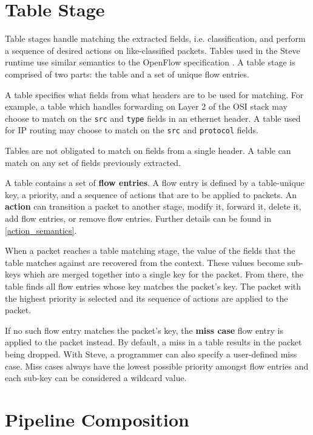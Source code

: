 \section{Table Stage}

Table stages handle matching the extracted fields, i.e. classification, and perform a sequence of desired actions on like-classified packets. Tables used in the Steve runtime use similar semantics to the OpenFlow specification \cite{openflow_spec}. A table stage is comprised of two parts: the table and a set of unique flow entries.

A table specifies what fields from what headers are to be used for matching. For example, a table which handles forwarding on Layer 2 of the OSI stack may choose to match on the \texttt{src} and \texttt{type} fields in an ethernet header. A table used for IP routing may choose to match on the \texttt{src} and \texttt{protocol} fields. 

Tables are not obligated to match on fields from a single header. A table can match on any set of fields previously extracted.

A table contains a set of \textbf{flow entries}. A flow entry is defined by a table-unique key, a priority, and a sequence of actions that are to be applied to packets. An \textbf{action} can transition a packet to another stage, modify it, forward it, delete it, add flow entries, or remove flow entries. Further details can be found in \ref{action_semantics}.

When a packet reaches a table matching stage, the value of the fields that the table matches against are recovered from the context. These values become sub-keys which are merged together into a single key for the packet. From there, the table finds all flow entries whose key matches the packet's key. The packet with the highest priority is selected and its sequence of actions are applied to the packet.

If no such flow entry matches the packet's key, the \textbf{miss case} flow entry is applied to the packet instead. By default, a miss in a table results in the packet being dropped. With Steve, a programmer can also specify a user-defined miss case. Miss cases always have the lowest possible priority amongst flow entries and each sub-key can be considered a wildcard value.


\section{Pipeline Composition}

